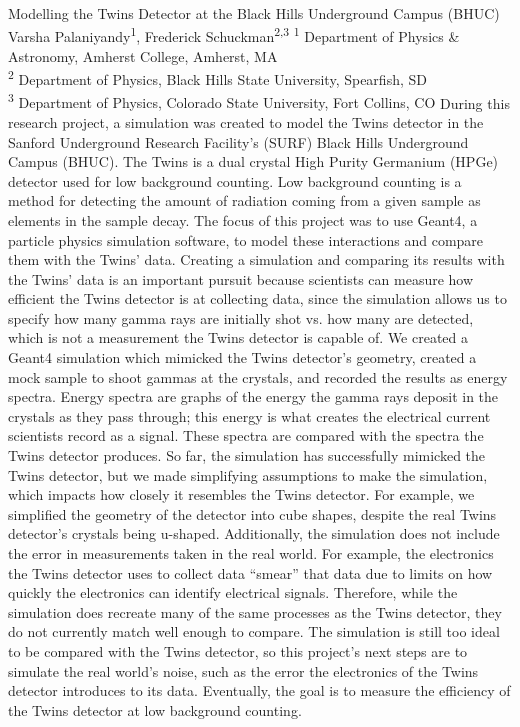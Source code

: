 \makeabstract
    {
    Modelling the Twins Detector at the Black Hills Underground Campus (BHUC)
    }
    {
    Varsha Palaniyandy\textsuperscript{1}, Frederick Schuckman\textsuperscript{2,3}
    }
    {
    \textsuperscript{1} Department of Physics \& Astronomy, Amherst College, Amherst, MA\\
\textsuperscript{2} Department of Physics, Black Hills State University, Spearfish, SD\\
\textsuperscript{3} Department of Physics, Colorado State University, Fort Collins, CO
    }
    {
    During this research project, a simulation was created to model the Twins detector in the Sanford Underground Research Facility{\textquoteright}s (SURF) Black Hills Underground Campus (BHUC). The Twins is a dual crystal High Purity Germanium (HPGe) detector used for low background counting. Low background counting is a method for detecting the amount of radiation coming from a given sample as elements in the sample decay. The focus of this project was to use Geant4, a particle physics simulation software, to model these interactions and compare them with the Twins{\textquoteright} data. Creating a simulation and comparing its results with the Twins{\textquoteright} data is an important pursuit because scientists can measure how efficient the Twins detector is at collecting data, since the simulation allows us to specify how many gamma rays are initially shot vs. how many are detected, which is not a measurement the Twins detector is capable of.
    }
    {
    We created a Geant4 simulation which mimicked the Twins detector{\textquoteright}s geometry, created a mock sample to shoot gammas at the crystals, and recorded the results as energy spectra. Energy spectra are graphs of the energy the gamma rays deposit in the crystals as they pass through; this energy is what creates the electrical current scientists record as a signal. These spectra are compared with the spectra the Twins detector produces.
    }
    {
    So far, the simulation has successfully mimicked the Twins detector, but we made simplifying assumptions to make the simulation, which impacts how closely it resembles the Twins detector. For example, we simplified the geometry of the detector into cube shapes, despite the real Twins detector{\textquoteright}s crystals being u-shaped. Additionally, the simulation does not include the error in measurements taken in the real world. For example, the electronics the Twins detector uses to collect data {\textquotedblleft}smear{\textquotedblright} that data due to limits on how quickly the electronics can identify electrical signals. Therefore, while the simulation does recreate many of the same processes as the Twins detector, they do not currently match well enough to compare.
    }
    {
    The simulation is still too ideal to be compared with the Twins detector, so this project{\textquoteright}s next steps are to simulate the real world{\textquoteright}s noise, such as the error the electronics of the Twins detector introduces to its data. Eventually, the goal is to measure the efficiency of the Twins detector at low background counting.
    }

    \newpage
    